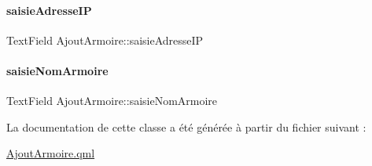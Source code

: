 \paragraph{\texorpdfstring{saisie\+Adresse\+IP}{saisieAdresseIP}}
{\footnotesize\ttfamily Text\+Field Ajout\+Armoire\+::saisie\+Adresse\+IP\hspace{0.3cm}{\ttfamily [private]}}

\mbox{\label{class_ajout_armoire_a7f816d7c8df70b18528bf260b43408d9}} 
\paragraph{\texorpdfstring{saisie\+Nom\+Armoire}{saisieNomArmoire}}
{\footnotesize\ttfamily Text\+Field Ajout\+Armoire\+::saisie\+Nom\+Armoire\hspace{0.3cm}{\ttfamily [private]}}



La documentation de cette classe a été générée à partir du fichier suivant \+:\begin{DoxyCompactItemize}
\item 
\hyperlink{_ajout_armoire_8qml}{Ajout\+Armoire.\+qml}\end{DoxyCompactItemize}
